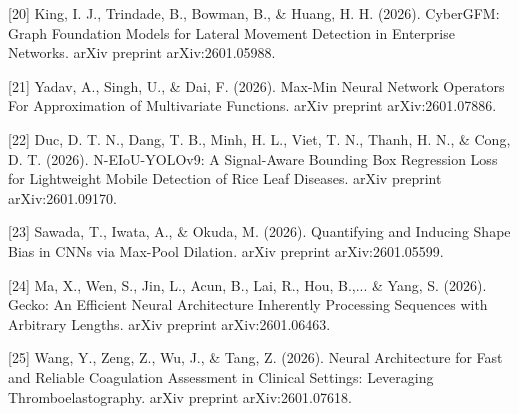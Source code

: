 \documentclass{article}
\begin{document}
[20] King, I. J., Trindade, B., Bowman, B., \& Huang, H. H. (2026). CyberGFM: Graph Foundation Models for Lateral Movement Detection in Enterprise Networks. arXiv preprint arXiv:2601.05988.

[21] Yadav, A., Singh, U., \& Dai, F. (2026). Max-Min Neural Network Operators For Approximation of Multivariate Functions. arXiv preprint arXiv:2601.07886.

[22] Duc, D. T. N., Dang, T. B., Minh, H. L., Viet, T. N., Thanh, H. N., \& Cong, D. T. (2026). N-EIoU-YOLOv9: A Signal-Aware Bounding Box Regression Loss for Lightweight Mobile Detection of Rice Leaf Diseases. arXiv preprint arXiv:2601.09170.

[23] Sawada, T., Iwata, A., \& Okuda, M. (2026). Quantifying and Inducing Shape Bias in CNNs via Max-Pool Dilation. arXiv preprint arXiv:2601.05599.

[24] Ma, X., Wen, S., Jin, L., Acun, B., Lai, R., Hou, B.,... \& Yang, S. (2026). Gecko: An Efficient Neural Architecture Inherently Processing Sequences with Arbitrary Lengths. arXiv preprint arXiv:2601.06463.

[25] Wang, Y., Zeng, Z., Wu, J., \& Tang, Z. (2026). Neural Architecture for Fast and Reliable Coagulation Assessment in Clinical Settings: Leveraging Thromboelastography. arXiv preprint arXiv:2601.07618.
\end{document}

